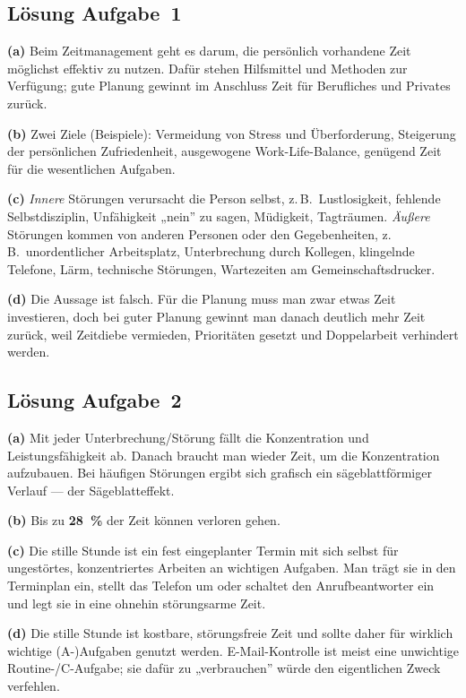 \documentclass[11pt, a4paper]{article}
\begin{document}
\subsection*{Lösung Aufgabe~1}
\begin{loesung}
\textbf{(a)} Beim Zeitmanagement geht es darum, die persönlich vorhandene Zeit möglichst
effektiv zu nutzen. Dafür stehen Hilfsmittel und Methoden zur Verfügung; gute Planung
gewinnt im Anschluss Zeit für Berufliches und Privates zurück.

\textbf{(b)} Zwei Ziele (Beispiele): Vermeidung von Stress und Überforderung, Steigerung
der persönlichen Zufriedenheit, ausgewogene Work-Life-Balance, genügend Zeit für die
wesentlichen Aufgaben.

\textbf{(c)} \emph{Innere} Störungen verursacht die Person selbst, z.\,B.\ Lustlosigkeit,
fehlende Selbstdisziplin, Unfähigkeit „nein” zu sagen, Müdigkeit, Tagträumen.
\emph{Äußere} Störungen kommen von anderen Personen oder den Gegebenheiten, z.\,B.\
unordentlicher Arbeitsplatz, Unterbrechung durch Kollegen, klingelnde Telefone, Lärm,
technische Störungen, Wartezeiten am Gemeinschaftsdrucker.

\textbf{(d)} Die Aussage ist falsch. Für die Planung muss man zwar etwas Zeit
investieren, doch bei guter Planung gewinnt man danach deutlich mehr Zeit zurück, weil
Zeitdiebe vermieden, Prioritäten gesetzt und Doppelarbeit verhindert werden.
\end{loesung}

\subsection*{Lösung Aufgabe~2}
\begin{loesung}
\textbf{(a)} Mit jeder Unterbrechung/Störung fällt die Konzentration und
Leistungsfähigkeit ab. Danach braucht man wieder Zeit, um die Konzentration aufzubauen.
Bei häufigen Störungen ergibt sich grafisch ein sägeblattförmiger Verlauf --- der
Sägeblatteffekt.

\textbf{(b)} Bis zu \textbf{28~\%} der Zeit können verloren gehen.

\textbf{(c)} Die stille Stunde ist ein fest eingeplanter Termin mit sich selbst für
ungestörtes, konzentriertes Arbeiten an wichtigen Aufgaben. Man trägt sie in den
Terminplan ein, stellt das Telefon um oder schaltet den Anrufbeantworter ein und legt
sie in eine ohnehin störungsarme Zeit.

\textbf{(d)} Die stille Stunde ist kostbare, störungsfreie Zeit und sollte daher für
wirklich wichtige (A-)Aufgaben genutzt werden. E-Mail-Kontrolle ist meist eine
unwichtige Routine-/C-Aufgabe; sie dafür zu „verbrauchen” würde den eigentlichen Zweck
verfehlen.
\end{loesung}
\end{document}
